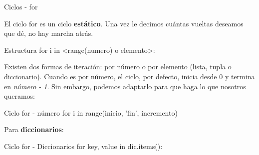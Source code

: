 \begin{frame}[t]{Ciclos - for}\vspace{0pt}

El ciclo for es un ciclo \textbf{est\'atico}. Una vez le decimos cu\'antas vueltas deseamos que d\'e, no hay marcha atr\'as.

\begin{block}{Estructura}
	for i in <range(numero) o elemento>:
\end{block}

\vspace{5pt}

Existen dos formas de iteraci\'on: por n\'umero o por elemento (lista, tupla o diccionario). Cuando es por \underline{n\'umero}, el ciclo, por defecto, inicia desde 0 y termina en \textit{n\'umero - 1}. Sin embargo, podemos adaptarlo para que haga lo que nosotros queramos:

\begin{block}{Ciclo for - n\'umero}
	for i in range(inicio, 'fin', incremento)
\end{block}

Para \textbf{diccionarios}:

\begin{block}{Ciclo for - Diccionarios}
	for key, value in dic.items():
\end{block}

\end{frame}